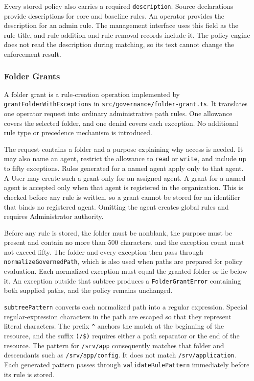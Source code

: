 Every stored policy also carries a required \texttt{description}. Source
declarations provide descriptions for core and baseline rules. An operator
provides the description for an admin rule. The management interface uses this
field as the rule title, and rule-addition and rule-removal records include it.
The policy engine does not read the description during matching, so its text
cannot change the enforcement result.


\subsubsection{Folder Grants}

A folder grant is a rule-creation operation implemented by
\texttt{grantFolderWithExceptions} in
\texttt{src/governance/folder-grant.ts}. It translates one operator request
into ordinary administrative path rules. One allowance covers the selected
folder, and one denial covers each exception. No additional rule type or
precedence mechanism is introduced.

The request contains a folder and a purpose explaining why access is needed.
It may also name an agent, restrict the allowance to \texttt{read} or
\texttt{write}, and include up to fifty exceptions. Rules generated for a
named agent apply only to that agent. A User may create such a grant only for
an assigned agent. {\color{red}A grant for a named agent is accepted only
when that agent is registered in the organization. This is checked before any
rule is written, so a grant cannot be stored for an identifier that binds no
registered agent.} Omitting
the agent creates global rules and requires Administrator authority.

Before any rule is stored, the folder must be nonblank, the purpose must be
present and contain no more than 500 characters, and the exception count must
not exceed fifty. The folder and every exception then pass through
\texttt{normalizeGovernedPath}, which is also used when paths are prepared for
policy evaluation. Each normalized exception must equal the granted folder or
lie below it. An exception outside that subtree produces a
\texttt{FolderGrantError} containing both supplied paths, and the policy
remains unchanged.

\texttt{subtreePattern} converts each normalized path into a regular
expression. Special regular-expression characters in the path are escaped so
that they represent literal characters. The prefix \texttt{\^{}} anchors the
match at the beginning of the resource, and the suffix
\texttt{(/\textbar\$)} requires either a path separator or the end of the
resource. The pattern for \texttt{/srv/app} consequently matches that folder
and descendants such as \texttt{/srv/app/config}. It does not match
\texttt{/srv/application}. Each generated pattern passes through
\texttt{validateRulePattern} immediately before its rule is stored.

